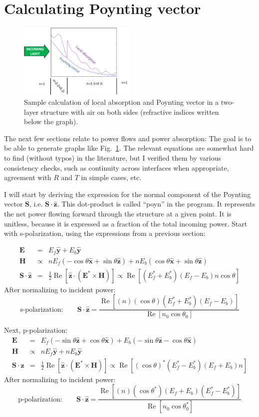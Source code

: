 \documentclass[12pt]{article}
\newcommand{\bea}{\begin{eqnarray*}} %
\newcommand{\eea}{\end{eqnarray*}} %
\renewcommand{\(}{\left(}
\renewcommand{\)}{\right)}
\renewcommand{\Re}{\operatorname{Re}}
\newcommand{\E}{\mathbf{E}}
\renewcommand{\H}{\mathbf{H}}
\renewcommand{\S}{\mathbf{S}}
\newcommand{\x}{\hat{\mathbf{x}}}
\newcommand{\y}{\hat{\mathbf{y}}}
\newcommand{\z}{\hat{\mathbf{z}}}
\begin{document}
\section{Calculating Poynting vector}

\begin{figure}[htb]
\centering
\includegraphics[width=0.5\textwidth]{spatiallyresolvedexample.png}
\caption{Sample calculation of local absorption and Poynting vector in a two-layer structure with air on both sides (refractive indices written below the graph).\label{spatiallyresolvedexample}}
\end{figure}

The next few sections relate to power flows and power absorption: The goal is to be able to generate graphs like Fig.~\ref{spatiallyresolvedexample}. The relevant equations are somewhat hard to find (without typos) in the literature, but I verified them by various consistency checks, such as continuity across interfaces when appropriate, agreement with $R$ and $T$ in simple cases, etc.

I will start by deriving the expression for the normal component of the Poynting vector $\S$, i.e. $\S\cdot\z$. This dot-product is called ``poyn'' in the program. It represents the net power flowing forward through the structure at a given point. It is unitless, because it is expressed as a fraction of the total incoming power. Start with s-polarization, using the expressions from a previous section:

\bea
\E &=& E_f \y + E_b \y \\
\H &\propto& n E_f \( - \cos \theta \x +  \sin \theta \z\) + n E_b\( \cos \theta \x + \sin \theta \z\) \\
\S \cdot \z &=& \frac12 \Re[ \z \cdot (\E^* \times \H)] \propto \Re[(E_f^*+E_b^*) (E_f - E_b)n \cos \theta]\eea
After normalizing to incident power:
$$\text{s-polarization:} \qquad \S \cdot \z = \frac{\Re\left[ (n) (\cos \theta) (E_f^* + E_b^*) (E_f - E_b)\right]}{\Re\left[ n_0 \cos \theta_0\right] }$$

Next, p-polarization:
\bea
\E &=& E_f(-\sin \theta \z +  \cos \theta \x) + E_b(- \sin \theta \z -  \cos \theta \x) \\
\H &\propto& n E_f \y + n E_b \y \\
\S \cdot \z &=& \frac12\Re[ \z \cdot (\E^* \times \H)] \propto \Re[(\cos \theta)^*(E_f^*-E_b^*) (E_f + E_b)n ]\eea
After normalizing to incident power:
$$\text{p-polarization:} \qquad \S \cdot \z = \frac{\Re\left[ (n) (\cos \theta^*) (E_f + E_b) (E_f^* - E_b^*)\right]}{\Re \left[ n_0 \cos \theta_0^* \right]}$$
\end{document}
